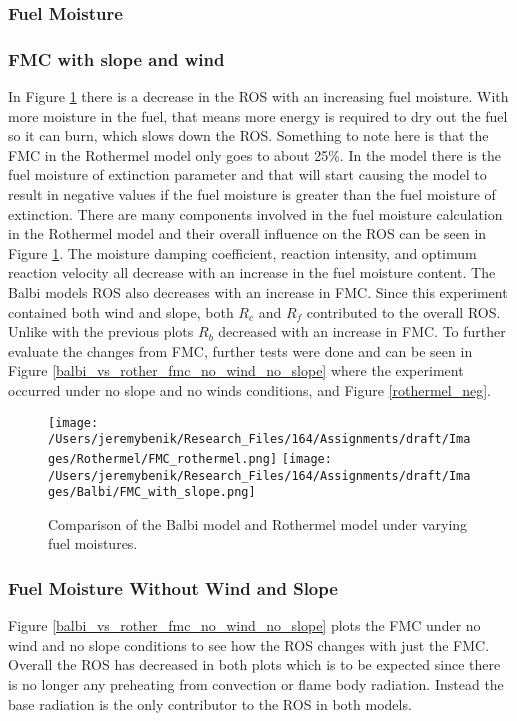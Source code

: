 \documentclass{article}
\begin{document}
\subsubsection{Fuel Moisture}
\subsubsection*{FMC with slope and wind}
\indent In Figure \ref{FMC} there is a decrease in the ROS with an increasing fuel moisture. With more moisture in the fuel, that means more energy is required to dry out the fuel so it can burn, which slows down the ROS. Something to note here is that the FMC in the Rothermel model only goes to about 25\%. In the model there is the fuel moisture of extinction parameter and that will start causing the model to result in negative values if the fuel moisture is greater than the fuel moisture of extinction. There are many components involved in the fuel moisture calculation in the Rothermel model and their overall influence on the ROS can be seen in Figure \ref{FMC}. The moisture damping coefficient, reaction intensity, and optimum reaction velocity all decrease with an increase in the fuel moisture content. The Balbi models ROS also decreases with an increase in FMC. Since this experiment contained both wind and slope, both $R_c$ and $R_f$ contributed to the overall ROS. Unlike with the previous plots $R_b$ decreased with an increase in FMC. To further evaluate the changes from FMC, further tests were done and can be seen in Figure \ref{balbi_vs_rother_fmc_no_wind_no_slope} where the experiment occurred under no slope and no winds conditions, and Figure \ref{rothermel_neg}. \\
\newpage
\begin{figure}[!h]
\centering
  \texttt{[image: /Users/jeremybenik/Research\_Files/164/Assignments/draft/Images/Rothermel/FMC\_rothermel.png]}
  \texttt{[image: /Users/jeremybenik/Research\_Files/164/Assignments/draft/Images/Balbi/FMC\_with\_slope.png]}
  \caption{Comparison of the Balbi model and Rothermel model under varying fuel moistures.}
  \label{FMC}
\end{figure}
\subsubsection*{Fuel Moisture Without Wind and Slope}
\indent Figure \ref{balbi_vs_rother_fmc_no_wind_no_slope} plots the FMC under no wind and no slope conditions to see how the ROS changes with just the FMC. Overall the ROS has decreased in both plots which is to be expected since there is no longer any preheating from convection or flame body radiation. Instead the base radiation is the only contributor to the ROS in both models.
\newpage
\end{document}
